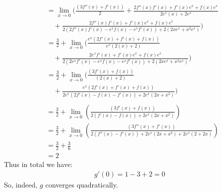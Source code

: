\documentclass{article}
\begin{document}
\begin{enumerate}[label=\alph*.)]
\begin{align*}
&= \lim_{x \rightarrow 0}(\frac{(3f''(x) + f'(x))}{2} + \frac{2f''(x)f'(x) + f'(x)e^x + f(x)e^x}{2e^x(x) + 2e^x} \\
&\quad +\frac{2f''(x)f'(x) + f'(x)e^x + f(x)e^x}{2(2f''(x)f'(x) -e^xf(x) - e^xf'(x)) + 2(2xe^x + x^2e^x)} )\\
&= \frac{3}{2} + \lim_{x \rightarrow 0}(\frac{e^x(2f'(x) + f'(x) + f(x))}{e^x(2(x) + 2)} \\
&\quad +\frac{2e^xf'(x) + f'(x)e^x + f(x)e^x}{2(2e^xf'(x) -e^xf(x) - e^xf'(x)) + 2(2xe^x + x^2e^x)} )\\
&= \frac{3}{2} + \lim_{x \rightarrow 0}(\frac{(3f'(x) + f(x))}{(2(x) + 2)} \\
&\quad +\frac{e^x(2f'(x) + f'(x) + f(x))}{2e^x(2f'(x) -f(x) - f'(x)) + 2e^x(2x + x^2)} )\\
\end{align*}
\begin{align*}
&= \frac{3}{2} + \lim_{x \rightarrow 0}(\frac{(3f'(x)+ f(x))}{2(f'(x) -f(x)) + 2e^x(2x + x^2)} )\\
&=  \frac{3}{2} + \lim_{x \rightarrow 0}(\frac{(3f''(x)+ f'(x))}{2(f''(x) -f'(x)) + 2e^x(2x + x^2) + 2e^x(2 + 2x)} )\\
&= \frac{3}{2} + \frac{3}{6} \\
&= 2
\end{align*}
Thus in total we have:\\
\begin{align*}
g'(0) = 1 - 3 + 2 = 0
\end{align*}
So, indeed, $g$ converges quadratically. 
\end{enumerate}
\end{document}
